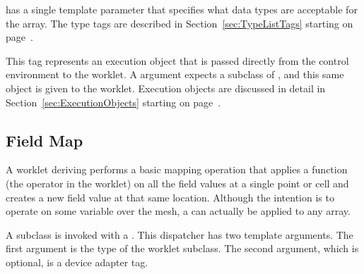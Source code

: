 {   has a single template parameter that specifies
  what data types are acceptable for the array. The type tags are described
  in Section~\ref{sec:TypeListTags} starting on page~\pageref{TypeTagList}.

\item[\sigtag{ExecObject}] This tag represents an execution object that is
  passed directly from the control environment to the worklet. A
   argument expects a subclass of
  , and this same object is given to the
  worklet. Execution objects are discussed in detail in
  Section~\ref{sec:ExecutionObjects} starting on
  page~\pageref{sec:ExecutionObjects}.
}

\newcommand{\numericexecutionsignaturetags}{
\item[\sigtagnum{1}, \sigtagnum{2},$\ldots$] These reference the
  corresponding parameter in the \controlsignature.
}

\newcommand{\commonexecutionsignaturetags}{
\item[\sigtag{WorkIndex}] This tag produces a \vtkm{Id} that uniquely
  identifies the invocation of the worklet.
\item[\sigtag{VisitIndex}] This tag produces a \vtkm{IdComponent} that
  uniquely identifies when multiple worklet invocations operate on the same
  input item, which can happen when defining a worklet with scatter (as
  described in Section~\ref{sec:WorkletScatter}).
}

\subsection{Field Map}


A worklet deriving  performs a basic mapping
operation that applies a function (the operator in the worklet) on all the
field values at a single point or cell and creates a new field value at
that same location. Although the intention is to operate on some variable
over the mesh, a  can actually be applied
to any array.

A  subclass is invoked with a
. This dispatcher has two template
arguments. The first argument is the type of the worklet subclass. The
second argument, which is optional, is a device adapter tag.

